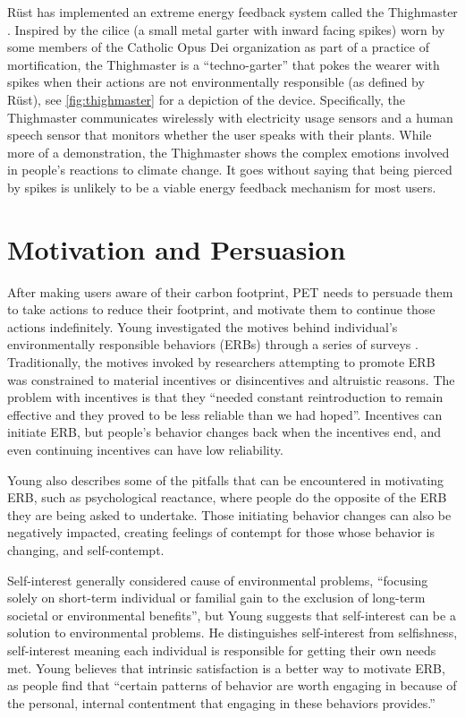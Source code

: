 R\"{u}st has implemented an extreme energy feedback system called the Thighmaster \cite{Rust2008Thighmaster-web}. Inspired by the cilice (a small metal garter with inward facing spikes) worn by some members of the Catholic Opus Dei organization as part of a practice of mortification, the Thighmaster is a ``techno-garter'' that pokes the wearer with spikes when their actions are not environmentally responsible (as defined by R\"{u}st), see \autoref{fig:thighmaster} for a depiction of the device. Specifically, the Thighmaster communicates wirelessly with electricity usage sensors and a human speech sensor that monitors whether the user speaks with their plants. While more of a demonstration, the Thighmaster shows the complex emotions involved in people's reactions to climate change. It goes without saying that being pierced by spikes is unlikely to be a viable energy feedback mechanism for most users.


\section{Motivation and Persuasion}

After making users aware of their carbon footprint, PET needs to persuade them to take actions to reduce their footprint, and motivate them to continue those actions indefinitely. Young investigated the motives behind individual's environmentally responsible behaviors (ERBs) through a series of surveys \cite{Young:2000fv}. Traditionally, the motives invoked by researchers attempting to promote ERB was constrained to material incentives or disincentives and altruistic reasons. The problem with incentives is that they ``needed constant reintroduction to remain effective and they proved to be less reliable than we had hoped''. Incentives can initiate ERB, but people's behavior changes back when the incentives end, and even continuing incentives can have low reliability.

Young also describes some of the pitfalls that can be encountered in motivating ERB, such as psychological reactance, where people do the opposite of the ERB they are being asked to undertake. Those initiating behavior changes can also be negatively impacted, creating feelings of contempt for those whose behavior is changing, and self-contempt.

Self-interest generally considered cause of environmental problems, ``focusing 
solely on short-term individual or familial gain to the exclusion of long-term societal or environmental benefits'', but Young suggests that self-interest can be a solution to environmental problems. He distinguishes self-interest from selfishness, self-interest meaning each individual is responsible for getting their own needs met. Young believes that intrinsic satisfaction is a better way to motivate ERB, as people find that ``certain patterns of behavior are worth engaging in because of the personal, internal contentment that engaging in these behaviors provides.''


